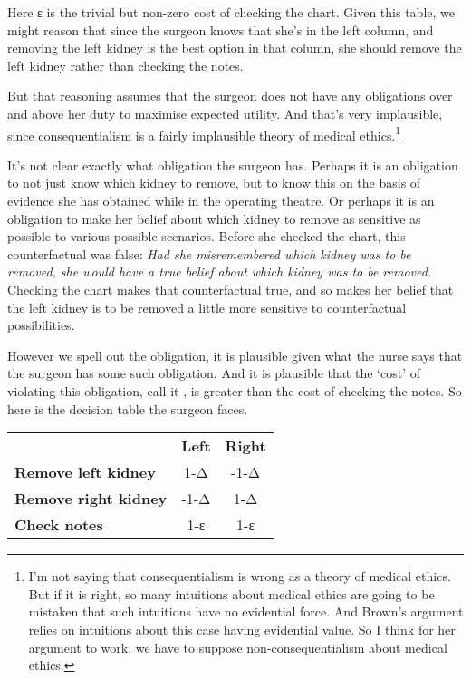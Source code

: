 \documentclass[
  11pt,
  letterpaper,
  DIV=11,
  numbers=noendperiod,
  twoside]{scrartcl}
\begin{document}
Here ε is the trivial but non-zero cost of checking the chart. Given
this table, we might reason that since the surgeon knows that she's in
the left column, and removing the left kidney is the best option in that
column, she should remove the left kidney rather than checking the
notes.

But that reasoning assumes that the surgeon does not have any
obligations over and above her duty to maximise expected utility. And
that's very implausible, since consequentialism is a fairly implausible
theory of medical ethics.\footnote{I'm not saying that consequentialism
  is wrong as a theory of medical ethics. But if it is right, so many
  intuitions about medical ethics are going to be mistaken that such
  intuitions have no evidential force. And Brown's argument relies on
  intuitions about this case having evidential value. So I think for her
  argument to work, we have to suppose non-consequentialism about
  medical ethics.}

It's not clear exactly what obligation the surgeon has. Perhaps it is an
obligation to not just know which kidney to remove, but to know this on
the basis of evidence she has obtained while in the operating theatre.
Or perhaps it is an obligation to make her belief about which kidney to
remove as sensitive as possible to various possible scenarios. Before
she checked the chart, this counterfactual was false: \emph{Had she
misremembered which kidney was to be removed, she would have a true
belief about which kidney was to be removed.} Checking the chart makes
that counterfactual true, and so makes her belief that the left kidney
is to be removed a little more sensitive to counterfactual
possibilities.

However we spell out the obligation, it is plausible given what the
nurse says that the surgeon has some such obligation. And it is
plausible that the `cost' of violating this obligation, call it , is
greater than the cost of checking the notes. So here is the decision
table the surgeon faces.

\begin{longtable}[]{@{}lcc@{}}
\toprule\noalign{}
\endhead
\bottomrule\noalign{}
\endlastfoot
& \textbf{Left} & \textbf{Right} \\
\textbf{Remove left kidney} & 1-Δ & -1-Δ \\
\textbf{Remove right kidney} & -1-Δ & 1-Δ \\
\textbf{Check notes} & 1-ε & 1-ε \\
\end{longtable}
\end{document}
